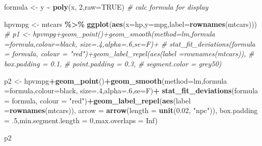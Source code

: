 \documentclass[
]{article}
\newenvironment{Shaded}{\begin{snugshade}}{\end{snugshade}}
\newcommand{\AttributeTok}[1]{\textcolor[rgb]{0.13,0.29,0.53}{#1}}
\newcommand{\CommentTok}[1]{\textcolor[rgb]{0.56,0.35,0.01}{\textit{#1}}}
\newcommand{\ConstantTok}[1]{\textcolor[rgb]{0.56,0.35,0.01}{#1}}
\newcommand{\DecValTok}[1]{\textcolor[rgb]{0.00,0.00,0.81}{#1}}
\newcommand{\FloatTok}[1]{\textcolor[rgb]{0.00,0.00,0.81}{#1}}
\newcommand{\FunctionTok}[1]{\textcolor[rgb]{0.13,0.29,0.53}{\textbf{#1}}}
\newcommand{\NormalTok}[1]{#1}
\newcommand{\OtherTok}[1]{\textcolor[rgb]{0.56,0.35,0.01}{#1}}
\newcommand{\SpecialCharTok}[1]{\textcolor[rgb]{0.81,0.36,0.00}{\textbf{#1}}}
\newcommand{\StringTok}[1]{\textcolor[rgb]{0.31,0.60,0.02}{#1}}
\begin{document}
\begin{Shaded}
\begin{Highlighting}[]
\NormalTok{formula }\OtherTok{\textless{}{-}}\NormalTok{ y }\SpecialCharTok{\textasciitilde{}} \FunctionTok{poly}\NormalTok{(x, }\DecValTok{2}\NormalTok{,}\AttributeTok{raw=}\ConstantTok{TRUE}\NormalTok{) }\CommentTok{\# calc formula for display}

\NormalTok{hpvmpg }\OtherTok{\textless{}{-}}\NormalTok{ mtcars }\SpecialCharTok{\%\textgreater{}\%} \FunctionTok{ggplot}\NormalTok{(}\FunctionTok{aes}\NormalTok{(}\AttributeTok{x=}\NormalTok{hp,}\AttributeTok{y=}\NormalTok{mpg,}\AttributeTok{label=}\FunctionTok{rownames}\NormalTok{(mtcars)))}
\CommentTok{\# p1 \textless{}{-} hpvmpg+geom\_point()+geom\_smooth(method=\textquotesingle{}lm\textquotesingle{},formula =formula,colour=\textquotesingle{}black\textquotesingle{}, size=.4,alpha=.6,se=F)+}
\CommentTok{\#   stat\_fit\_deviations(formula = formula, colour = "red")+geom\_label\_repel(aes(label =rownames(mtcars)),}
\CommentTok{\#                   box.padding   = 0.1, }
\CommentTok{\#                   point.padding = 0.3,}
\CommentTok{\#                   segment.color = \textquotesingle{}grey50\textquotesingle{})}

\NormalTok{p2 }\OtherTok{\textless{}{-}}\NormalTok{ hpvmpg}\SpecialCharTok{+}\FunctionTok{geom\_point}\NormalTok{()}\SpecialCharTok{+}\FunctionTok{geom\_smooth}\NormalTok{(}\AttributeTok{method=}\StringTok{\textquotesingle{}lm\textquotesingle{}}\NormalTok{,}\AttributeTok{formula =}\NormalTok{formula,}\AttributeTok{colour=}\StringTok{\textquotesingle{}black\textquotesingle{}}\NormalTok{, }\AttributeTok{size=}\NormalTok{.}\DecValTok{4}\NormalTok{,}\AttributeTok{alpha=}\NormalTok{.}\DecValTok{6}\NormalTok{,}\AttributeTok{se=}\NormalTok{F)}\SpecialCharTok{+}
  \FunctionTok{stat\_fit\_deviations}\NormalTok{(}\AttributeTok{formula =}\NormalTok{ formula, }\AttributeTok{colour =} \StringTok{"red"}\NormalTok{)}\SpecialCharTok{+}\FunctionTok{geom\_label\_repel}\NormalTok{(}\FunctionTok{aes}\NormalTok{(}\AttributeTok{label =}\FunctionTok{rownames}\NormalTok{(mtcars)),}
    \AttributeTok{arrow =} \FunctionTok{arrow}\NormalTok{(}\AttributeTok{length =} \FunctionTok{unit}\NormalTok{(}\FloatTok{0.02}\NormalTok{, }\StringTok{"npc"}\NormalTok{)),}
    \AttributeTok{box.padding =}\NormalTok{ .}\DecValTok{5}\NormalTok{,}\AttributeTok{min.segment.length =} \DecValTok{0}\NormalTok{,}\AttributeTok{max.overlaps =} \ConstantTok{Inf}\NormalTok{)}

\NormalTok{ p2}
\end{Highlighting}
\end{Shaded}
\end{document}
